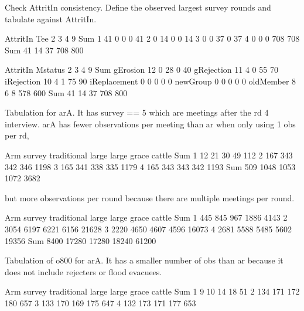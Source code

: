 Check \textsf{AttritIn} consistency. Define the observed largest survey rounds and tabulate against \textsf{AttritIn}.
\begin{Schunk}
\begin{Soutput}
     AttritIn
Tee     2   3   4   9 Sum
  1    41   0   0   0  41
  2     0  14   0   0  14
  3     0   0  37   0  37
  4     0   0   0 708 708
  Sum  41  14  37 708 800
\end{Soutput}
\begin{Soutput}
              AttritIn
Mstatus          2   3   4   9 Sum
  gErosion      12   0  28   0  40
  gRejection    11   4   0  55  70
  iRejection    10   4   1  75  90
  iReplacement   0   0   0   0   0
  newGroup       0   0   0   0   0
  oldMember      8   6   8 578 600
  Sum           41  14  37 708 800
\end{Soutput}
\end{Schunk}
Tabulation for \textsf{arA}. It has survey == 5 which are meetings after the rd 4 interview. \textsf{arA} has fewer observations per meeting than \textsf{ar} when only using 1 obs per rd,
\begin{Schunk}
\begin{Soutput}
      Arm
survey traditional large large grace cattle  Sum
   1            12    21          30     49  112
   2           167   343         342    346 1198
   3           165   341         338    335 1179
   4           165   343         343    342 1193
   Sum         509  1048        1053   1072 3682
\end{Soutput}
\end{Schunk}
but more observations per round because there are multiple meetings per round. \gobblepars
\begin{Schunk}
\begin{Soutput}
      Arm
survey traditional large large grace cattle   Sum
   1           445   845         967   1886  4143
   2          3054  6197        6221   6156 21628
   3          2220  4650        4607   4596 16073
   4          2681  5588        5485   5602 19356
   Sum        8400 17280       17280  18240 61200
\end{Soutput}
\end{Schunk}
Tabulation of o800 for \textsf{arA}. It has a smaller number of obs than \textsf{ar} because it does not include rejecters or flood evacuees.
\begin{Schunk}
\begin{Soutput}
      Arm
survey traditional large large grace cattle Sum
     1           9    10          14     18  51
     2         134   171         172    180 657
     3         133   170         169    175 647
     4         132   173         171    177 653
\end{Soutput}
\end{Schunk}
